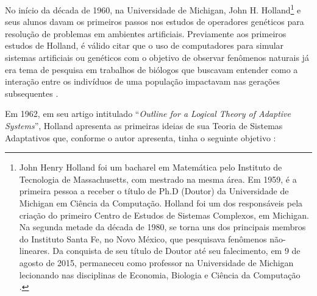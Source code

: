 No início da década de 1960, na Universidade de Michigan, John H. Holland\footnote{John Henry Holland foi um bacharel em Matemática pelo Instituto de Tecnologia de Massachusetts, com mestrado na mesma área. Em 1959, é a primeira pessoa a receber o título de Ph.D (Doutor) da Universidade de Michigan em Ciência da Computação. Holland foi um dos responsáveis pela criação do primeiro Centro de Estudos de Sistemas Complexos, em Michigan. Na segunda metade da década de 1980, se torna uns dos principais membros do Instituto Santa Fe, no Novo México, que pesquisava fenômenos não-lineares. Da conquista de seu título de Doutor até seu falecimento, em 9 de agosto de 2015, permaneceu como professor na Universidade de Michigan lecionando nas disciplinas de Economia, Biologia e Ciência da Computação \citep{britannica_2022}.} e seus alunos davam os primeiros passos nos estudos de operadores genéticos para resolução de problemas em ambientes artificiais. Previamente aos primeiros estudos de Holland, é válido citar que o uso de computadores para simular sistemas artificiais ou genéticos com o objetivo de observar fenômenos naturais já era tema de pesquisa em trabalhos de biólogos que buscavam entender como a interação entre os indivíduos de uma população impactavam nas gerações subsequentes \citep[p.90]{goldberg_genetic_1989}.

Em 1962, em seu artigo intitulado \enquote{\textit{Outline for a Logical Theory of Adaptive Systems}}, Holland apresenta as primeiras ideias de sua Teoria de Sistemas Adaptativos que, conforme o autor apresenta, tinha o seguinte objetivo \citep{holland_1962}:

